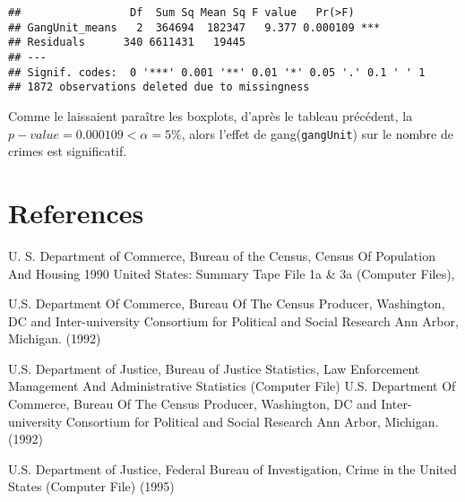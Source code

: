 \documentclass[
]{book}
\begin{document}
\begin{verbatim}
##                 Df  Sum Sq Mean Sq F value   Pr(>F)    
## GangUnit_means   2  364694  182347   9.377 0.000109 ***
## Residuals      340 6611431   19445                     
## ---
## Signif. codes:  0 '***' 0.001 '**' 0.01 '*' 0.05 '.' 0.1 ' ' 1
## 1872 observations deleted due to missingness
\end{verbatim}

Comme le laissaient paraître les boxplots, d'après le tableau précédent, la \(p-value=0.000109<\alpha=5\%\), alors l'effet de gang(\texttt{gangUnit}) sur le nombre de crimes est significatif.

\hypertarget{references}{%
\chapter*{References}\label{references}}

U. S. Department of Commerce, Bureau of the Census, Census Of Population And Housing 1990 United States: Summary Tape File 1a \& 3a (Computer Files),

U.S. Department Of Commerce, Bureau Of The Census Producer, Washington, DC and Inter-university Consortium for Political and Social Research Ann Arbor, Michigan. (1992)

U.S. Department of Justice, Bureau of Justice Statistics, Law Enforcement Management And Administrative Statistics (Computer File) U.S. Department Of Commerce, Bureau Of The Census Producer, Washington, DC and Inter-university Consortium for Political and Social Research Ann Arbor, Michigan. (1992)

U.S. Department of Justice, Federal Bureau of Investigation, Crime in the United States (Computer File) (1995)

  
\end{document}
